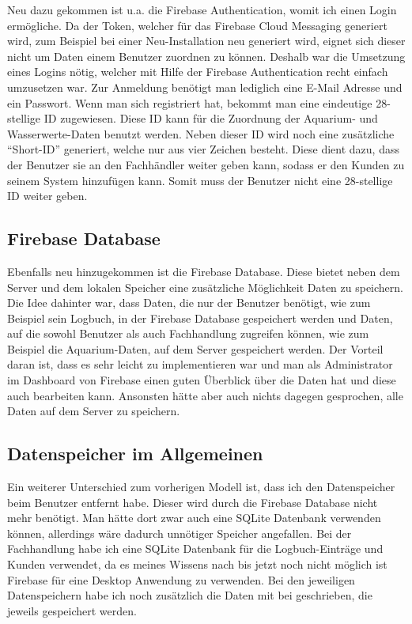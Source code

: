 Neu dazu gekommen ist u.a. die Firebase Authentication, womit ich einen Login ermögliche. Da der Token, welcher für das Firebase Cloud Messaging generiert wird, zum Beispiel bei einer Neu-Installation neu generiert wird, eignet sich dieser nicht um Daten einem Benutzer zuordnen zu können. Deshalb war die Umsetzung eines Logins nötig, welcher mit Hilfe der Firebase Authentication recht einfach umzusetzen war. Zur Anmeldung benötigt man lediglich eine E-Mail Adresse und ein Passwort. Wenn man sich registriert hat, bekommt man eine eindeutige 28-stellige ID zugewiesen. Diese ID kann für die Zuordnung der Aquarium- und Wasserwerte-Daten benutzt werden. Neben dieser ID wird noch eine zusätzliche ``Short-ID'' generiert, welche nur aus vier Zeichen besteht. Diese dient dazu, dass der Benutzer sie an den Fachhändler weiter geben kann, sodass er den Kunden zu seinem System hinzufügen kann. Somit muss der Benutzer nicht eine 28-stellige ID weiter geben.

\subsection{Firebase Database}

Ebenfalls neu hinzugekommen ist die Firebase Database. Diese bietet neben dem Server und dem lokalen Speicher eine zusätzliche Möglichkeit Daten zu speichern. Die Idee dahinter war, dass Daten, die nur der Benutzer benötigt, wie zum Beispiel sein Logbuch, in der Firebase Database gespeichert werden und Daten, auf die sowohl Benutzer als auch Fachhandlung zugreifen können, wie zum Beispiel die Aquarium-Daten, auf dem Server gespeichert werden. Der Vorteil daran ist, dass es sehr leicht zu implementieren war und man als Administrator im Dashboard von Firebase einen guten Überblick über die Daten hat und diese auch bearbeiten kann. Ansonsten hätte aber auch nichts dagegen gesprochen, alle Daten auf dem Server zu speichern.

\subsection{Datenspeicher im Allgemeinen}

Ein weiterer Unterschied zum vorherigen Modell ist, dass ich den Datenspeicher beim Benutzer entfernt habe. Dieser wird durch die Firebase Database nicht mehr benötigt. Man hätte dort zwar auch eine SQLite Datenbank verwenden können, allerdings wäre dadurch unnötiger Speicher angefallen. Bei der Fachhandlung habe ich eine SQLite Datenbank für die Logbuch-Einträge und Kunden verwendet, da es meines Wissens nach bis jetzt noch nicht möglich ist Firebase für eine Desktop Anwendung zu verwenden. Bei den jeweiligen Datenspeichern habe ich noch zusätzlich die Daten mit bei geschrieben, die jeweils gespeichert werden.


